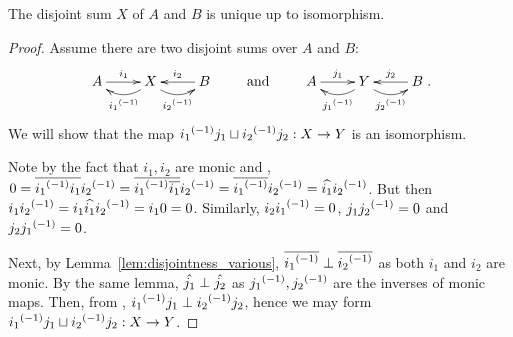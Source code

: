 \begin{lemma}\label{lem:disjoint_sum_is_unique}
  The disjoint sum $X$ of $A$ and $B$ is unique up to isomorphism.
\end{lemma}
\begin{proof}
  Assume there are two disjoint sums over $A$ and $B$:
  \[
    \xymatrix{
      A\ar[r]^{i_1} &X\ar@/^9pt/[l]^{\inv{i_1}} \ar@/_9pt/[r]_{\inv{i_2}} & B \ar[l]_{i_2}
    }
    \qquad  \text{ and  }\qquad
    \xymatrix{
      A\ar[r]^{\jay_1} &Y\ar@/^9pt/[l]^{\inv{\jay_1}} \ar@/_9pt/[r]_{\inv{\jay_2}} & B \ar[l]_{\jay_2}
    }.
  \]
  We will show that the map ${i_1}^{(-1)} j_1 \sqcup {i_2}^{(-1)} j_2 : X \to Y$ is an isomorphism.

  Note by the fact that $i_1, i_2$ are monic and ,
  $0 = \overline{{i_1}^{(-1)} i_1} {i_2}^{(-1)} = \overline{{i_1}^{(-1)}\overline{i_1}} {i_2}^{(-1)} = \overline{{i_1}^{(-1)}} {i_2}^{(-1)} = \widehat{i_1}{{i_2}^{(-1)}}$. But then
  $i_1 {i_2}^{(-1)} = i_1 \widehat{i_1} {i_2}^{(-1)} = i_1 0 = 0$. Similarly, $i_2 {i_1}^{(-1)} = 0$, $j_1 {j_2}^{(-1)} =0$ and
  $j_2 {j_1}^{(-1)} = 0$.

  Next, by Lemma~\ref{lem:disjointness_various}, $\overline{{i_1}^{(-1)}}\perp\overline{{i_2}^{(-1)}}$ as both
  $i_1$ and $i_2$ are monic. By the same lemma, $\hat{j_1} \perp \hat{j_2}$ as ${j_1}^{(-1)}, {j_2}^{(-1)}$
  are the inverses of monic maps.  Then, from , ${i_1}^{(-1)} j_1 \perp {i_2}^{(-1)} j_2$,
  hence we may form ${i_1}^{(-1)} j_1 \sqcup {i_2}^{(-1)} j_2 : X \to Y$.


\end{proof}
